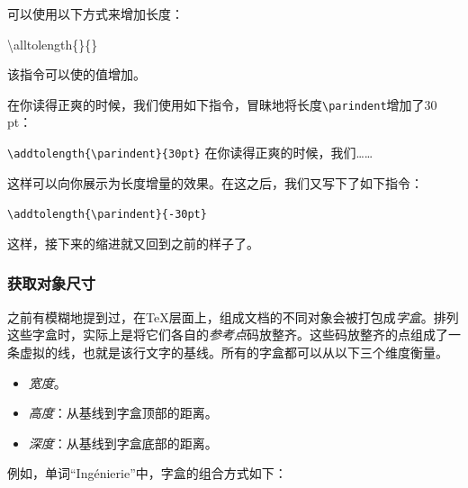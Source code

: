 可以使用以下方式来增加长度：

\begin{dmd}
\backslash alltolength\{\}\{\}
\end{dmd}

该指令可以使的值增加。

\addtolength{\parindent}{30pt} 在你读得正爽的时候，我们使用如下指令，冒昧地将长度\verb|\parindent|增加了30 pt：

\begin{dmd}
\verb+\addtolength{\parindent}{30pt}+ 在你读得正爽的时候，我们……
\end{dmd}

\addtolength{\parindent}{-30pt}
这样可以向你展示为长度增量的效果。在这之后，我们又写下了如下指令：

\begin{dmd}
\verb|\addtolength{\parindent}{-30pt}|
\end{dmd}

这样，接下来的缩进就又回到之前的样子了。

\subsubsection{获取对象尺寸}

之前有模糊地提到过，在\TeX 层面上，组成文档的不同对象会被打包成\emph{字盒}。排列这些字盒时，实际上是将它们各自的\emph{参考点}码放整齐。这些码放整齐的点组成了一条虚拟的线，也就是该行文字的基线。所有的字盒都可以从以下三个维度衡量。

\begin{itemize}
  \item \emph{宽度}。
  \item \emph{高度}：从基线到字盒顶部的距离。
  \item \emph{深度}：从基线到字盒底部的距离。
\end{itemize}

例如，单词``Ingénierie''中，字盒的组合方式如下：

\newsavebox{\boitecar}
\newlength{\interletter}
\newcommand{\refpoint}{\raisebox{-0.5\height}{\small$\circ$}}

\newcommand{\letterbox}[1]{%
   \setlength{\fboxsep}{0pt}%
   \setlength{\fboxrule}{0.2pt}%
   \sbox{\boitecar}{\framebox{\Huge#1}}%
   \settowidth{\letterwidth}{\usebox{\boitecar}}%
   \settowidth{\interletter}{\Huge#1}%
   \makebox[0pt]{\refpoint}%
   \usebox{\boitecar}%
   \kern-\fboxrule%
}


